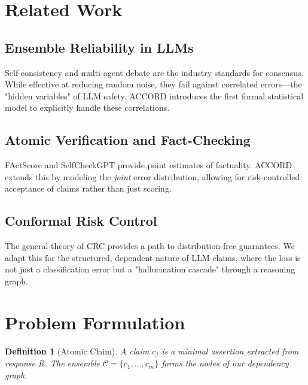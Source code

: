 \documentclass[conference]{IEEEtran}
\newtheorem{definition}{Definition}
\begin{document}
\section{Related Work}

\subsection{Ensemble Reliability in LLMs}
Self-consistency \cite{wang2022selfconsistency} and multi-agent debate \cite{du2023debate} are the industry standards for consensus. While effective at reducing random noise, they fail against correlated errors—the "hidden variables" of LLM safety. ACCORD introduces the first formal statistical model to explicitly handle these correlations.

\subsection{Atomic Verification and Fact-Checking}
FActScore \cite{min2023factscore} and SelfCheckGPT \cite{manakul2023selfcheckgpt} provide point estimates of factuality. ACCORD extends this by modeling the \textit{joint} error distribution, allowing for risk-controlled acceptance of claims rather than just scoring.

\subsection{Conformal Risk Control}
The general theory of CRC \cite{angelopoulos2022crc} provides a path to distribution-free guarantees. We adapt this for the structured, dependent nature of LLM claims, where the loss is not just a classification error but a "hallucination cascade" through a reasoning graph.

\section{Problem Formulation}

\begin{definition}[Atomic Claim]
A claim $c_j$ is a minimal assertion extracted from response $R$. The ensemble $\mathcal{C} = \{c_1, \dots, c_m\}$ forms the nodes of our dependency graph.
\end{definition}
\end{document}
